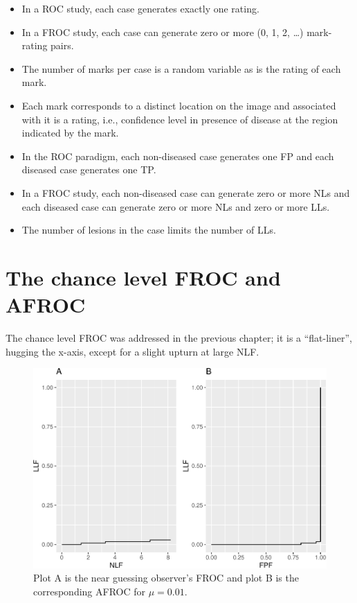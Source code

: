 \documentclass[
]{book}
\begin{document}
\begin{itemize}
\item
  In a ROC study, each case generates exactly one rating.
\item
  In a FROC study, each case can generate zero or more (0, 1, 2, \ldots) mark-rating pairs.
\item
  The number of marks per case is a random variable as is the rating of each mark.
\item
  Each mark corresponds to a distinct location on the image and associated with it is a rating, i.e., confidence level in presence of disease at the region indicated by the mark.
\item
  In the ROC paradigm, each non-diseased case generates one FP and each diseased case generates one TP.
\item
  In a FROC study, each non-diseased case can generate zero or more NLs and each diseased case can generate zero or more NLs and zero or more LLs.
\item
  The number of lesions in the case limits the number of LLs.
\end{itemize}

\hypertarget{the-chance-level-froc-and-afroc}{%
\section{The chance level FROC and AFROC}\label{the-chance-level-froc-and-afroc}}

The chance level FROC was addressed in the previous chapter; it is a ``flat-liner'', hugging the x-axis, except for a slight upturn at large NLF.

\begin{figure}
\centering
\includegraphics{13b-froc-empirical2_files/figure-latex/froc-afroc-chance-level-1.pdf}
\caption{\label{fig:froc-afroc-chance-level}Plot A is the near guessing observer's FROC and plot B is the corresponding AFROC for \(\mu=0.01\).}
\end{figure}
\end{document}
